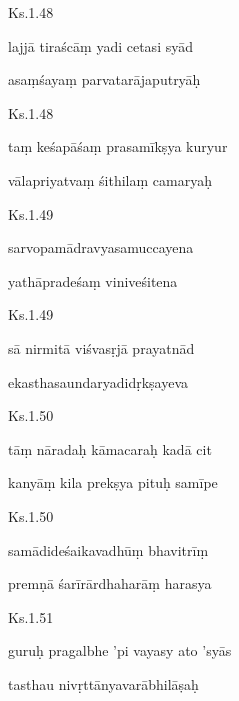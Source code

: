 \documentclass{tufte-handout}
\newenvironment{sanskrit}%
{\begin{otherlanguage}{sanskrit-devanagari}}%
{\end{otherlanguage}}
\begin{document}
    
	\begin{sanskrit}
	
	    
		Ks.1.48 
    
	    
		lajjā tiraścāṃ yadi cetasi syād 
    
	    
		asaṃśayaṃ parvatarājaputryāḥ 
    
	\end{sanskrit}

    
	\begin{sanskrit}
	
	    
		Ks.1.48 
    
	    
		taṃ keśapāśaṃ prasamīkṣya kuryur 
    
	    
		vālapriyatvaṃ śithilaṃ camaryaḥ 
    
	\end{sanskrit}

    
	\begin{sanskrit}
	
	    
		Ks.1.49 
    
	    
		sarvopamādravyasamuccayena 
    
	    
		yathāpradeśaṃ viniveśitena 
    
	\end{sanskrit}

    
	\begin{sanskrit}
	
	    
		Ks.1.49 
    
	    
		sā nirmitā viśvasṛjā prayatnād 
    
	    
		ekasthasaundaryadidṛkṣayeva 
    
	\end{sanskrit}

    
	\begin{sanskrit}
	
	    
		Ks.1.50 
    
	    
		tāṃ nāradaḥ kāmacaraḥ kadā cit 
    
	    
		kanyāṃ kila prekṣya pituḥ samīpe 
    
	\end{sanskrit}

    
	\begin{sanskrit}
	
	    
		Ks.1.50 
    
	    
		samādideśaikavadhūṃ bhavitrīṃ 
    
	    
		premṇā śarīrārdhaharāṃ harasya 
    
	\end{sanskrit}

    
	\begin{sanskrit}
	
	    
		Ks.1.51 
    
	    
		guruḥ pragalbhe 'pi vayasy ato 'syās 
    
	    
		tasthau nivṛttānyavarābhilāṣaḥ 
    
	\end{sanskrit}
\end{document}
